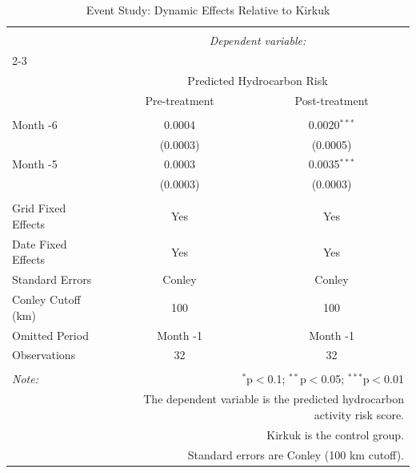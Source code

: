 
\begin{table}[!htbp] \centering 
  \caption{Event Study: Dynamic Effects Relative to Kirkuk} 
  \label{tab:eventstudy_pre_post} 
\scriptsize 
\begin{tabular}{@{\extracolsep{5pt}}lcc} 
\\[-1.8ex]\hline 
\hline \\[-1.8ex] 
 & \multicolumn{2}{c}{\textit{Dependent variable:}} \\ 
\cline{2-3} 
\\[-1.8ex] & \multicolumn{2}{c}{Predicted Hydrocarbon Risk} \\ 
 & Pre-treatment & Post-treatment \\ 
\hline \\[-1.8ex] 
 Month -6 & 0.0004 & 0.0020$^{***}$ \\ 
  & (0.0003) & (0.0005) \\ 
  Month -5 & 0.0003 & 0.0035$^{***}$ \\ 
  & (0.0003) & (0.0003) \\ 
 \hline \\[-1.8ex] 
Grid Fixed Effects & Yes & Yes \\ 
Date Fixed Effects & Yes & Yes \\ 
Standard Errors & Conley & Conley \\ 
Conley Cutoff (km) & 100 & 100 \\ 
Omitted Period & Month -1 & Month -1 \\ 
Observations & 32 & 32 \\ 
\hline 
\hline \\[-1.8ex] 
\textit{Note:}  & \multicolumn{2}{r}{$^{*}$p$<$0.1; $^{**}$p$<$0.05; $^{***}$p$<$0.01} \\ 
 & \multicolumn{2}{r}{The dependent variable is the predicted hydrocarbon activity risk score.} \\ 
 & \multicolumn{2}{r}{Kirkuk is the control group.} \\ 
 & \multicolumn{2}{r}{Standard errors are Conley (100 km cutoff).} \\ 
\end{tabular} 
\end{table} 
